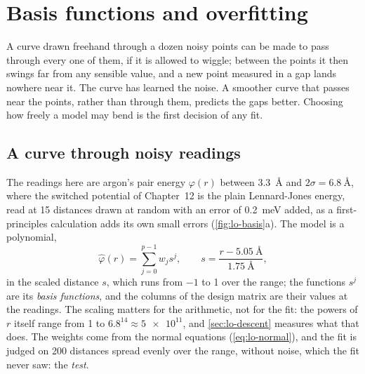 \section{Basis functions and overfitting}
\label{sec:lo-basis}

A curve drawn freehand through a dozen noisy points can be made to pass
through every one of them, if it is allowed to wiggle; between the
points it then swings far from any sensible value, and a new point
measured in a gap lands nowhere near it. The curve has learned the
noise. A smoother curve that passes near the points, rather than
through them, predicts the gaps better. Choosing how freely a model may
bend is the first decision of any fit.

\subsection*{A curve through noisy readings}

The readings here are argon's pair energy $\varphi(r)$ between
\SI{3.3}{\angstrom} and $2\sigma = \SI{6.8}{\angstrom}$, where the switched
potential of Chapter~12 is the plain Lennard-Jones energy, read at 15
distances drawn at random with an error of \SI{0.2}{\milli\electronvolt}
added, as a first-principles calculation adds its own small errors
(\cref{fig:lo-basis}a). The model is a polynomial,
\begin{equation*}
   \hat\varphi(r) = \sum_{j=0}^{p-1}w_js^j , \qquad
   s = \frac{r - \SI{5.05}{\angstrom}}{\SI{1.75}{\angstrom}} ,
\end{equation*}
in the scaled distance $s$, which runs from $-1$ to 1 over the range; the
functions $s^j$ are its \emph{basis functions}, and the columns of the
design matrix are their values at the readings. The scaling matters for
the arithmetic, not for the fit: the powers of $r$ itself range from 1
to $6.8^{14} \approx \num{5e11}$, and \cref{sec:lo-descent} measures what
that does. The weights come from the normal equations
(\cref{eq:lo-normal}), and the fit is judged on 200 distances spread
evenly over the range, without noise, which the fit never saw: the
\emph{test}.

